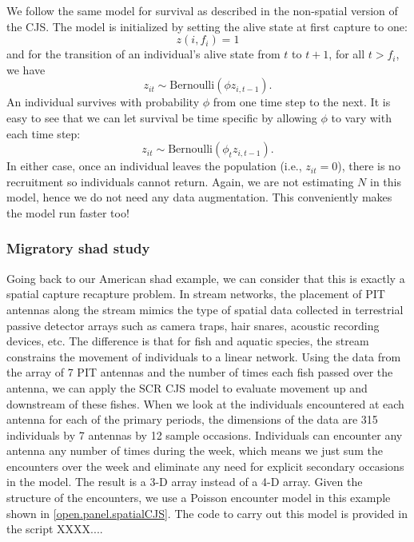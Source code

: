 We follow the same model for survival as described in the non-spatial version of the
CJS.  The model is initialized by setting the alive
state at first capture to one:
\[
 z(i,f_i) = 1
\]
and for the transition of an individual's alive state from $t$ to $t+1$, for
all $t > f_i$, we have
\[
z_{it} \sim \mbox{Bernoulli}( \phi z_{i,t-1}).
\]
An individual survives with probability
$\phi$ from one time step to the next.  It is easy to see that we can let
survival be time specific by allowing $\phi$ to vary with each time step:
\[
 z_{it} \sim \mbox{Bernoulli}( \phi_t z_{i,t-1}).
\]
In either case, once an individual leaves the
population (i.e., $z_{it} = 0$), there is no recruitment so individuals cannot
return.  Again, we are not estimating $N$ in this model, hence we do not need
any data augmentation.  This conveniently makes the model run
faster too!



\subsubsection{Migratory shad study}

Going back to our American shad example, we can consider that this is
exactly a spatial capture recapture problem.  In stream networks, the
placement of PIT antennas along the stream mimics the type of spatial
data collected in terrestrial passive detector arrays such as camera
traps, hair snares, acoustic recording devices, etc.  The difference
is that for fish and aquatic species, the stream constrains the
movement of individuals to a linear network.  Using the data from the
array of 7 PIT antennas and the number of times each fish passed over
the antenna, we can apply the SCR CJS model to evaluate movement up
and downstream of these fishes.  When we look at the individuals
encountered at each antenna for each of the primary periods, the
dimensions of the data are 315 individuals by 7 antennas by 12 sample
occasions. Individuals can encounter any antenna any number of times
during the week, which means we just sum the encounters over the week
and eliminate any need for explicit secondary occasions in the
model. The result is a 3-D array instead of a 4-D array.  Given the
structure of the encounters, we use a Poisson encounter model in this
example shown in \ref{open.panel.spatialCJS}.  The code to carry out this
model is provided in the script XXXX....



